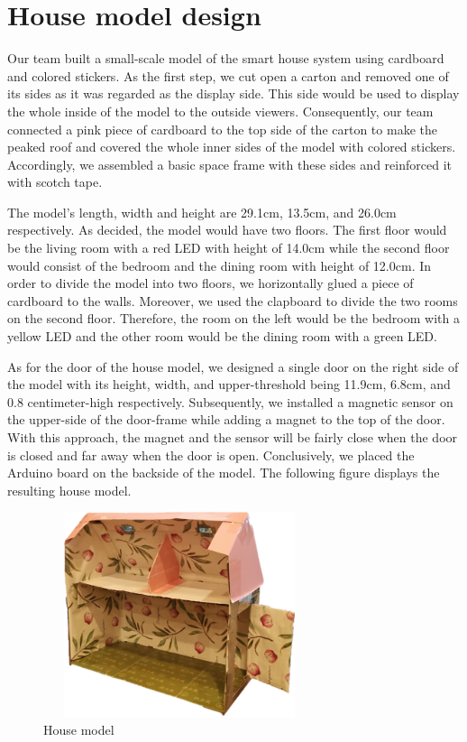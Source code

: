 \documentclass[12pt,a4paper]{report}
\begin{document}
\section{House model design}
Our team built a small-scale model of the smart house system using cardboard and colored stickers. As the first step, we cut open a carton and removed one of its sides as it was regarded as the display side. This side would be used to display the whole inside of the model to the outside viewers. Consequently, our team connected a pink piece of cardboard to the top side of the carton to make the peaked roof and covered the whole inner sides of the model with colored stickers. Accordingly, we assembled a basic space frame with these sides and reinforced it with scotch tape. 

\vspace{0.1cm}


\noindent The model’s length, width and height are 29.1cm, 13.5cm, and 26.0cm respectively. As decided, the model would have two floors. The first floor would be the living room with a red LED with height of 14.0cm while the second floor would consist of the bedroom and the dining room with height of 12.0cm. In order to divide the model into two floors, we horizontally glued a piece of cardboard to the walls. Moreover, we used the clapboard to divide the two rooms on the second floor. Therefore, the room on the left would be the bedroom with a yellow LED and the other room would be the dining room with a green LED. 



\vspace{0.1cm}
\noindent As for the door of the house model, we designed a single door on the right side of the model with its height, width, and upper-threshold being 11.9cm, 6.8cm, and 0.8 centimeter-high respectively. Subsequently, we installed a magnetic sensor on the upper-side of the door-frame while adding a magnet to the top of the door. With this approach, the magnet and the sensor will be fairly close when the door is closed and far away when the door is open. Conclusively, we placed the Arduino board on the backside of the model. The following figure displays the resulting house model.


\vspace{0.2cm}
\begin{figure}[H]
	\centering
	\includegraphics[height=6cm,width=8cm]{figures/house.png}
	\caption{House model}
\end{figure}
\end{document}

